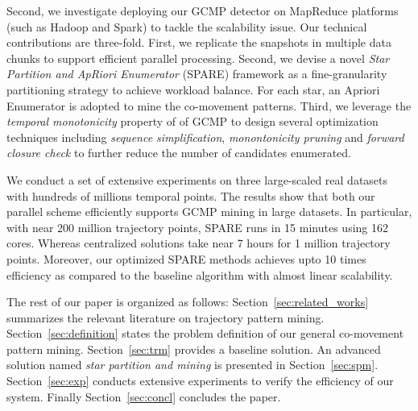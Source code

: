 


%

Second, we investigate deploying our GCMP detector on MapReduce platforms (such as Hadoop and Spark) to tackle the scalability issue. Our technical contributions are three-fold. First, we replicate the snapshots in multiple data chunks to support efficient parallel processing. Second, we devise a novel \emph{Star Partition and ApRiori Enumerator} (SPARE) framework as a fine-granularity partitioning strategy to achieve workload balance. For each star, an Apriori Enumerator is adopted to mine the co-movement patterns. Third, we leverage the \emph{temporal monotonicity} property of of GCMP 
to design several optimization techniques including \emph{sequence simplification}, \emph{monontonicity pruning} and \emph{forward closure check} to further reduce the number of candidates enumerated.
%


We conduct a set of extensive experiments on three large-scaled real datasets with hundreds of millions 
temporal points. 
The results show that both our parallel scheme efficiently supports GCMP mining in large datasets.
In particular, with near 200 million trajectory points, 
SPARE runs in 15 minutes using 162 cores. Whereas
centralized solutions take near 7 hours 
for 1 million trajectory points.
Moreover, our optimized SPARE methods achieves upto 10 times efficiency
as compared to the baseline algorithm with almost linear scalability.

The rest of our paper is organized as follows: Section~\ref{sec:related_works} summarizes the relevant literature on 
trajectory pattern mining. Section~\ref{sec:definition} states the problem definition of our general co-movement pattern mining. Section~\ref{sec:trm} provides a baseline solution. An advanced solution named
\emph{star partition and mining} is presented in Section~\ref{sec:spm}. Section~\ref{sec:exp} conducts extensive experiments to verify the efficiency of our system. Finally Section~\ref{sec:concl} concludes the paper.
